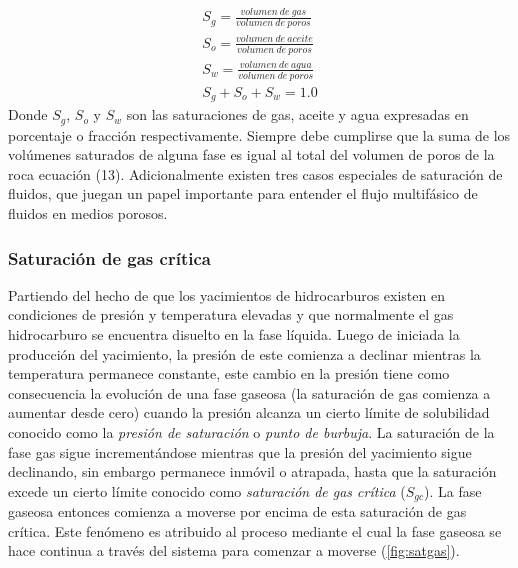  \begin{gather}
    S_{g}=\frac{volumen~ de~ gas}{volumen~ de~ poros}\\[10pt]
    S_{o}=\frac{volumen~ de~ aceite}{volumen~ de~ poros}\\[10pt]
    S_{w}=\frac{volumen~ de~ agua}{volumen~ de~ poros}\\[20pt]
    S_{g}+S_{o}+S_{w}=1.0
 \end{gather}
Donde $S_{g}$, $S_{o}$ y $S_{w}$ son las saturaciones de gas, aceite y agua expresadas en porcentaje o fracción respectivamente. Siempre debe cumplirse que la suma de los volúmenes saturados de alguna fase es igual al total del volumen de poros de la roca ecuación (13). Adicionalmente existen tres casos especiales de saturación de fluidos, que juegan un papel importante para entender el flujo multifásico de fluidos en medios porosos.

\subsubsection{Saturación de gas crítica}
Partiendo del hecho de que los yacimientos de hidrocarburos existen en condiciones de presión y temperatura elevadas y que normalmente el gas hidrocarburo se encuentra disuelto en la fase líquida. Luego de iniciada la producción del yacimiento, la presión de este comienza a declinar mientras la temperatura permanece constante, este cambio en la presión tiene como consecuencia la evolución de una fase gaseosa (la saturación de gas comienza a aumentar desde cero) cuando la presión alcanza un cierto límite de solubilidad conocido como la \emph{presión de saturación} o \emph{punto de burbuja}. La saturación de la fase gas sigue incrementándose mientras que la presión del yacimiento sigue declinando, sin embargo permanece inmóvil o atrapada, hasta que la saturación excede un cierto límite conocido como \emph{saturación de gas crítica} ($S_{gc}$). La fase gaseosa entonces comienza a moverse por encima de esta saturación de gas crítica. Este fenómeno es atribuido al proceso mediante el cual la fase gaseosa se hace continua a través del sistema para comenzar a moverse (\autoref{fig:satgas}).

